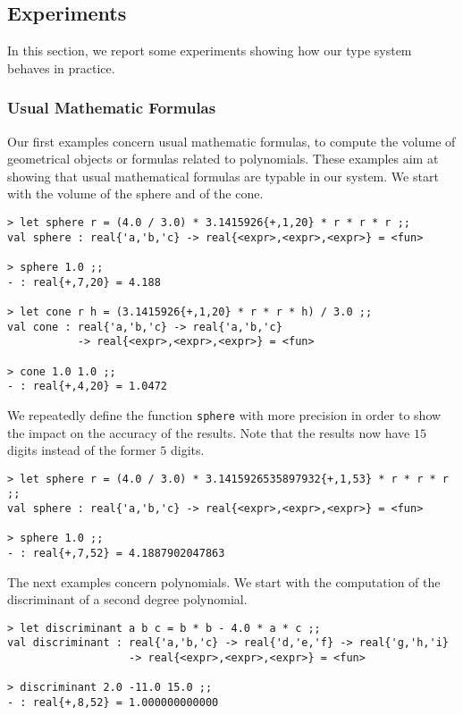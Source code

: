 
\subsection{Experiments}
\label{morex}

In this section, we report some experiments showing how our type system behaves in practice.

\subsubsection{Usual Mathematic Formulas}
\label{sssusmath}

Our first examples concern usual mathematic formulas, to compute the volume of 
geometrical objects or formulas related to polynomials. 
These examples aim at showing that usual mathematical formulas are typable in our system.
We start with the volume of the sphere and of the cone.

\begin{verbatim}
> let sphere r = (4.0 / 3.0) * 3.1415926{+,1,20} * r * r * r ;;
val sphere : real{'a,'b,'c} -> real{<expr>,<expr>,<expr>} = <fun>

> sphere 1.0 ;;
- : real{+,7,20} = 4.188

> let cone r h = (3.1415926{+,1,20} * r * r * h) / 3.0 ;;
val cone : real{'a,'b,'c} -> real{'a,'b,'c} 
           -> real{<expr>,<expr>,<expr>} = <fun>

> cone 1.0 1.0 ;;
- : real{+,4,20} = 1.0472
\end{verbatim}

We repeatedly define the function \texttt{sphere}  with more precision in order
to show the impact on the accuracy of the results. Note that the results now have $15$ digits instead
of the former $5$ digits.

\begin{verbatim}
> let sphere r = (4.0 / 3.0) * 3.1415926535897932{+,1,53} * r * r * r ;;
val sphere : real{'a,'b,'c} -> real{<expr>,<expr>,<expr>} = <fun>

> sphere 1.0 ;; 
- : real{+,7,52} = 4.1887902047863
\end{verbatim}


The next examples concern polynomials. We start with 
 the computation of the discriminant of a second degree polynomial.

\begin{verbatim}
> let discriminant a b c = b * b - 4.0 * a * c ;;
val discriminant : real{'a,'b,'c} -> real{'d,'e,'f} -> real{'g,'h,'i} 
                   -> real{<expr>,<expr>,<expr>} = <fun>

> discriminant 2.0 -11.0 15.0 ;;
- : real{+,8,52} = 1.000000000000
\end{verbatim}

